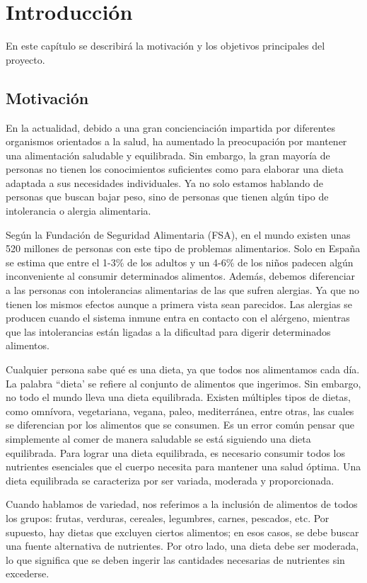 \chapter{Introducción}
En este capítulo se describirá la motivación y los objetivos principales del proyecto.

\section{Motivación}
En la actualidad, debido a una gran concienciación impartida por diferentes organismos orientados a la salud, ha aumentado la preocupación por mantener una alimentación saludable y equilibrada. Sin embargo, la gran mayoría de personas no tienen los conocimientos suficientes como para elaborar una dieta adaptada a sus necesidades individuales. Ya no solo estamos hablando de personas que buscan bajar peso, sino de personas que tienen algún tipo de intolerancia o alergia alimentaria.

Según la Fundación de Seguridad Alimentaria (FSA), en el mundo existen unas 520 millones de personas con este tipo de problemas alimentarios. Solo en España se estima que entre el 1-3\% de los adultos y un 4-6\% de los niños padecen algún inconveniente al consumir determinados alimentos. Además, debemos diferenciar a las personas con intolerancias alimentarias de las que sufren alergias. Ya que no tienen los mismos efectos aunque a primera vista sean parecidos. Las alergias se producen cuando el sistema inmune entra en contacto con el alérgeno, mientras que las intolerancias están ligadas a la dificultad para digerir determinados alimentos.\cite{FSA}

Cualquier persona sabe qué es una dieta, ya que todos nos alimentamos cada día. La palabra ``dieta' se refiere al conjunto de alimentos que ingerimos. Sin embargo, no todo el mundo lleva una dieta equilibrada. Existen múltiples tipos de dietas, como omnívora, vegetariana, vegana, paleo, mediterránea, entre otras, las cuales se diferencian por los alimentos que se consumen.
Es un error común pensar que simplemente al comer de manera saludable se está siguiendo una dieta equilibrada. Para lograr una dieta equilibrada, es necesario consumir todos los nutrientes esenciales que el cuerpo necesita para mantener una salud óptima. Una dieta equilibrada se caracteriza por ser variada, moderada y proporcionada.

Cuando hablamos de variedad, nos referimos a la inclusión de alimentos de todos los grupos: frutas, verduras, cereales, legumbres, carnes, pescados, etc. Por supuesto, hay dietas que excluyen ciertos alimentos; en esos casos, se debe buscar una fuente alternativa de nutrientes. Por otro lado, una dieta debe ser moderada, lo que significa que se deben ingerir las cantidades necesarias de nutrientes sin excederse.

